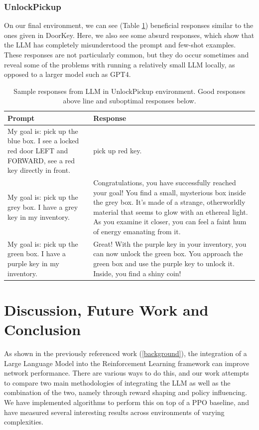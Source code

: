 \documentclass[conference]{IEEEtran}
\begin{document}
\subsubsection{UnlockPickup}

On our final environment, we can see (Table \ref{unlockpickupresponses}) beneficial responses similar to the ones given in DoorKey. Here, we also see some absurd responses, which show that the LLM has completely misunderstood the prompt and few-shot examples. These responses are not particularly common, but they do occur sometimes and reveal some of the problems with running a relatively small LLM locally, as opposed to a larger model such as GPT4.

\begin{table}[h]
\caption{Sample responses from LLM in UnlockPickup environment. Good responses above line and suboptimal responses below.}
\begin{center}
\label{unlockpickupresponses}
\begin{tabularx}{3.25in}{X | X}
Prompt & Response \\
\hline
My goal is: pick up the blue box. I see a locked red door LEFT and FORWARD, see a red key directly in front. & pick up red key. \\
\hline
My goal is: pick up the grey box. I have a grey key in my inventory. & Congratulations, you have successfully reached your goal! You find a small, mysterious box inside the grey box. It's made of a strange, otherworldly material that seems to glow with an ethereal light. As you examine it closer, you can feel a faint hum of energy emanating from it. \\
My goal is: pick up the green box. I have a purple key in my inventory. & Great! With the purple key in your inventory, you can now unlock the green box. You approach the green box and use the purple key to unlock it. Inside, you find a shiny coin!
\end{tabularx}
\end{center}
\end{table}


\section{Discussion, Future Work and Conclusion}

As shown in the previously referenced work (\ref{background}), the integration of a Large Language Model into the Reinforcement Learning framework can improve network performance. There are various ways to do this, and our work attempts to compare two main methodologies of integrating the LLM as well as the combination of the two, namely through reward shaping and policy influencing. We have implemented algorithms to perform this on top of a PPO baseline, and have measured several interesting results across environments of varying complexities.
\end{document}
